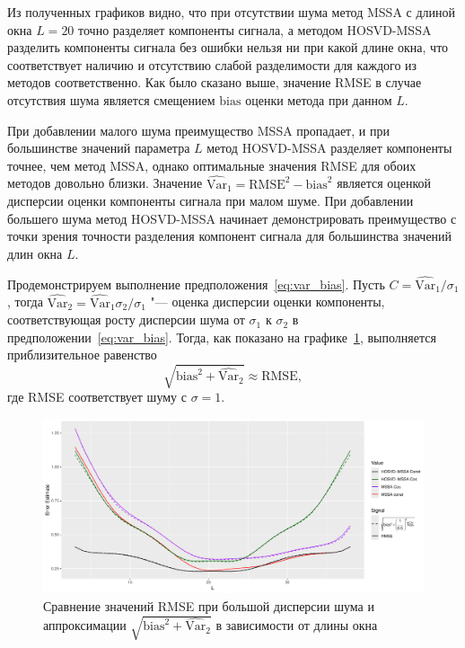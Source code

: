 \documentclass[specialist,
  substylefile=spbu.rtx,
subf,href,colorlinks=true, 12pt]{disser}
\theoremstyle{plain}
\theoremstyle{definition}
\theoremstyle{remark}
\begin{document}
Из полученных графиков видно, что при отсутствии шума метод MSSA с длиной окна $L=20$ точно разделяет
компоненты сигнала, а методом HOSVD-MSSA разделить компоненты сигнала без ошибки нельзя ни при какой длине окна,
что соответствует наличию и отсутствию слабой разделимости для каждого из методов соответственно.
Как было сказано выше, значение RMSE в случае отсутствия шума является смещением $\mathrm{bias}$
оценки метода при данном $L$.

При добавлении малого шума преимущество MSSA пропадает, и при большинстве значений параметра $L$ метод
HOSVD-MSSA разделяет компоненты точнее, чем метод MSSA, однако оптимальные значения RMSE для обоих методов
довольно близки.
Значение $\widehat{\mathrm{Var}}_1 = \mathrm{RMSE}^2 - \mathrm{bias}^2$ является оценкой дисперсии оценки компоненты сигнала при
малом шуме.
При добавлении большего шума метод HOSVD-MSSA начинает демонстрировать преимущество с точки зрения точности
разделения компонент сигнала для большинства значений длин окна $L$.


Продемонстрируем выполнение предположения~\eqref{eq:var_bias}.
Пусть $C=\widehat{\mathrm{Var}}_1 / \sigma_1$,
тогда $\widehat{\mathrm{Var}}_2 = \widehat{\mathrm{Var}}_1 \sigma_2 / \sigma_1$ "--- оценка дисперсии
оценки компоненты, соответствующая росту дисперсии шума от $\sigma_1$ к $\sigma_2$ в
предположении~\eqref{eq:var_bias}.
Тогда, как показано на графике~\ref{fig:approx-sep-errors}, выполняется приблизительное равенство
\[
  \sqrt{\mathrm{bias}^2 + \widehat{\mathrm{Var}}_2} \approx \mathrm{RMSE},
\]
где RMSE соответствует шуму с $\sigma = 1$.

\begin{figure}[!h]
  \centering
  \includegraphics[width=\textwidth]{approx_sep_errors}
  \caption{Сравнение значений RMSE при большой дисперсии шума и аппроксимации
  $\sqrt{\mathrm{bias}^2 + \widehat{\mathrm{Var}}_2}$ в зависимости от длины окна}
  \label{fig:approx-sep-errors}
\end{figure}
\end{document}
